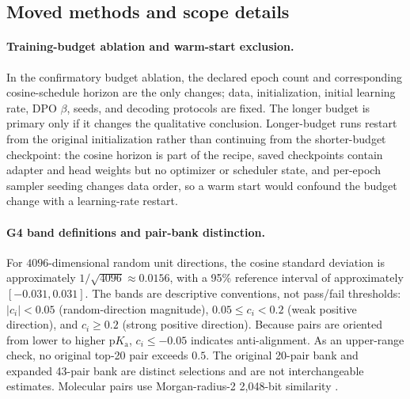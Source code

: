 \documentclass[11pt]{article}
\newcommand{\pka}{\mathrm{p}K_{\mathrm a}}
\begin{document}
\subsection{Moved methods and scope details}

\paragraph{Training-budget ablation and warm-start exclusion.} In the confirmatory budget ablation, the declared epoch count and corresponding cosine-schedule horizon are the only changes; data, initialization, initial learning rate, DPO $\beta$, seeds, and decoding protocols are fixed. The longer budget is primary only if it changes the qualitative conclusion. Longer-budget runs restart from the original initialization rather than continuing from the shorter-budget checkpoint: the cosine horizon is part of the recipe, saved checkpoints contain adapter and head weights but no optimizer or scheduler state, and per-epoch sampler seeding changes data order, so a warm start would confound the budget change with a learning-rate restart.
\label{sec:training_budget_appendix}

\paragraph{G4 band definitions and pair-bank distinction.} For $4096$-dimensional random unit directions, the cosine standard deviation is approximately $1/\sqrt{4096}\approx0.0156$, with a 95\% reference interval of approximately $[-0.031,0.031]$. The bands are descriptive conventions, not pass/fail thresholds: $\lvert c_i\rvert<0.05$ (random-direction magnitude), $0.05\leq c_i<0.2$ (weak positive direction), and $c_i\geq0.2$ (strong positive direction). Because pairs are oriented from lower to higher $\pka$, $c_i\leq-0.05$ indicates anti-alignment. As an upper-range check, no original top-20 pair exceeds $0.5$. The original 20-pair bank and expanded 43-pair bank are distinct selections and are not interchangeable estimates. Molecular pairs use Morgan-radius-2 2{,}048-bit similarity \citep{Rogers2010Extended}.
\label{sec:g4_bands_appendix}
\end{document}
